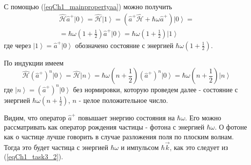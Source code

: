 С помощью (\ref{eqCh1_mainpropertyaa}) можно получить
\begin{eqnarray}
\hat{\mathcal{H}} \hat{a}^{+}\left|0\right> = 
\hat{\mathcal{H}} \left|1\right> =
\left(\hat{a}^{+} \hat{\mathcal{H}} + \hbar \omega \hat{a}^{+} \right)
\left|0\right> = 
\nonumber \\
= \hbar \omega \left(1 + \frac{1}{2}\right)
\hat{a}^{+} \left|0\right> = 
\hbar \omega \left(1 + \frac{1}{2}\right)
\left|1\right>
\end{eqnarray}
где через $\left|1\right> = \hat{a}^{+} \left|0\right>$ обозначено
состояние с энергией $\hbar \omega \left(1 + \frac{1}{2}\right)$.

По индукции имеем
\begin{equation}
\hat{\mathcal{H}} \left(\hat{a}^{+}\right)^n\left|0\right> = 
\hat{\mathcal{H}} \left|n\right> 
= \hbar \omega \left(n + \frac{1}{2}\right)
\left(\hat{a}^{+}\right)^n\left|0\right> = 
\hbar \omega \left(n + \frac{1}{2}\right)
\left|n\right>
\label{eqCh1_aplusinduction}
\end{equation}
где
$\left|n\right> = \left(\hat{a}^{+}\right)^n\left|0\right>$   
без нормировки, которую проведем далее -  состояние с энергией  
$\hbar \omega \left(n + \frac{1}{2}\right)$,  $n$  -  целое
положительное число.

Видим, что оператор  $\hat{a}^{+}$  повышает энергию состояния на
$\hbar \omega$.  Его можно рассматривать как оператор рождения частицы
- фотона с энергией  $\hbar \omega$.  О фотоне как о частице лучше
говорить в случае разложения поля по плоским волнам. Тогда это будет
частица с энергией $\hbar \omega$ и импульсом $\hbar \vec{k}$,  как
это следует из (\ref{eqCh1_task3_2}). 
  
